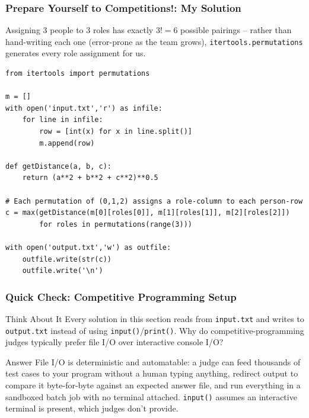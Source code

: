 \begin{frame}[fragile]\frametitle{Prepare Yourself to Competitions!: My Solution}
Assigning 3 people to 3 roles has exactly $3! = 6$ possible pairings -- rather than hand-writing each one (error-prone as the team grows), \texttt{itertools.permutations} generates every role assignment for us.
\begin{lstlisting}
from itertools import permutations

m = []
with open('input.txt','r') as infile:
	for line in infile:
		row = [int(x) for x in line.split()]
		m.append(row)

def getDistance(a, b, c):
	return (a**2 + b**2 + c**2)**0.5

# Each permutation of (0,1,2) assigns a role-column to each person-row
c = max(getDistance(m[0][roles[0]], m[1][roles[1]], m[2][roles[2]])
        for roles in permutations(range(3)))

with open('output.txt','w') as outfile:
	outfile.write(str(c))
	outfile.write('\n')
\end{lstlisting}
\end{frame}

\begin{frame}[fragile]\frametitle{Quick Check: Competitive Programming Setup}
\begin{block}{Think About It}
Every solution in this section reads from \texttt{input.txt} and writes to \texttt{output.txt} instead of using \texttt{input()}/\texttt{print()}. Why do competitive-programming judges typically prefer file I/O over interactive console I/O?
\end{block}
\pause
\begin{block}{Answer}
File I/O is deterministic and automatable: a judge can feed thousands of test cases to your program without a human typing anything, redirect output to compare it byte-for-byte against an expected answer file, and run everything in a sandboxed batch job with no terminal attached. \texttt{input()} assumes an interactive terminal is present, which judges don't provide.
\end{block}
\end{frame}
